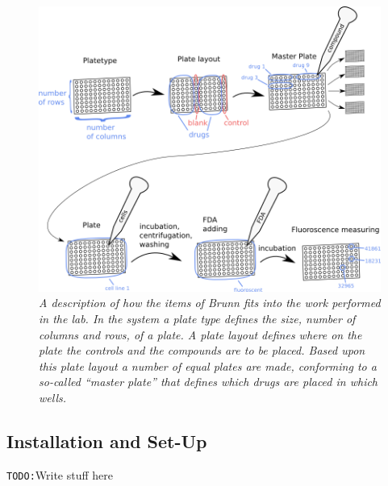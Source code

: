 \documentclass[a4paper,10pt]{article}
\begin{document}
        \begin{figure}[htbp]
            \begin{center}
                \includegraphics[width=1\textwidth]{images/labWork.png}
            \end{center}
            \caption{\textit{A description of how the items of Brunn fits into
                             the work performed in the lab. In the system a
                             plate type defines the size, number of columns and
                             rows, of a plate. A plate layout defines where on
                             the plate the controls and the compounds are to be
                             placed. Based upon this plate layout a number of
                             equal plates are made, conforming to a so-called
                             “master plate” that defines which drugs are placed
                             in which wells.}}
            \label{labWork}
        \end{figure}

         \subsection{Installation and Set-Up}
         \texttt{TODO:}Write stuff here
\end{document}
